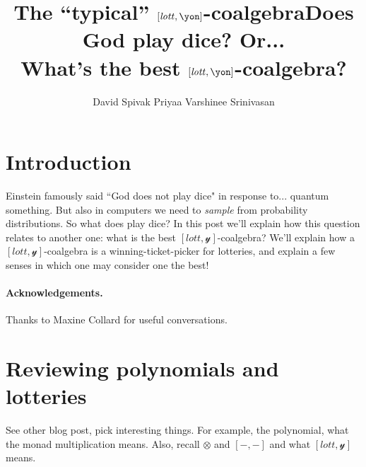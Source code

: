 \documentclass[11pt]{article}
\title{The ``typical'' $[\lott,\yon]$-coalgebra}
\title{Does God play dice? Or...\\What's the best $[\lott,\yon]$-coalgebra?}
\author{
   David Spivak \quad \quad \quad Priyaa Varshinee Srinivasan}
\date{\vspace{-.1in}}
\newcommand{\N}{\mathbb{N}}
\newcommand{\ox}{\otimes}
\newcommand{\Poly}{{\sf Poly}}
\newcommand{\lott}{\mathit{lott}}
\newcommand{\yon}{\mathcal{y}}
\begin{document}
\maketitle

\begin{abstract}

\end{abstract}

\section{Introduction}

Einstein famously said ``God does not play dice" in response to... quantum something. But also in computers we need to \emph{sample} from probability distributions. So what does play dice? In this post we'll explain how this question relates to another one: what is the best $[\lott,\yon]$-coalgebra? We'll explain how a $[\lott,\yon]$-coalgebra is a winning-ticket-picker for lotteries, and explain a few senses in which one may consider one the best!

\paragraph{Acknowledgements.} Thanks to Maxine Collard for useful conversations.

\section{Reviewing polynomials and lotteries}
See other blog post, pick interesting things. For example, the polynomial, what the monad multiplication means. Also, recall $\otimes$ and $[-,-]$ and what $[\lott,\yon]$ means.
%
%
%
%
%
\end{document}
